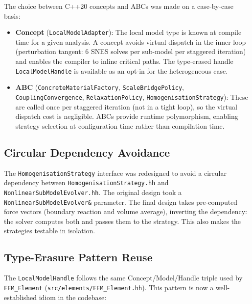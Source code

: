 The choice between C++20 concepts and ABCs was made on a
case-by-case basis:

\begin{itemize}
  \item \textbf{Concept} (\texttt{LocalModelAdapter}): The local
    model type is known at compile time for a given analysis.  A
    concept avoids virtual dispatch in the inner loop (perturbation
    tangent: 6 SNES solves per sub-model per staggered iteration)
    and enables the compiler to inline critical paths.  The
    type-erased handle \texttt{LocalModelHandle} is available as an
    opt-in for the heterogeneous case.

  \item \textbf{ABC} (\texttt{ConcreteMaterialFactory},
    \texttt{ScaleBridgePolicy}, \texttt{CouplingConvergence},
    \texttt{RelaxationPolicy}, \texttt{HomogenisationStrategy}):
    These are called once per staggered iteration (not in a tight
    loop), so the virtual dispatch cost is negligible.  ABCs provide
    runtime polymorphism, enabling strategy selection at
    configuration time rather than compilation time.
\end{itemize}

\subsection{Circular Dependency Avoidance}
\label{sec:refactor-circular-deps}

The \texttt{HomogenisationStrategy} interface was redesigned to
avoid a circular dependency between
\texttt{HomogenisationStrategy.hh} and
\texttt{NonlinearSubModelEvolver.hh}.  The original design took a
\texttt{NonlinearSubModelEvolver\&} parameter.  The final design
takes pre-computed force vectors (boundary reaction and volume
average), inverting the dependency: the solver computes both and
passes them to the strategy.  This also makes the strategies
testable in isolation.

\subsection{Type-Erasure Pattern Reuse}
\label{sec:refactor-type-erasure-pattern}

The \texttt{LocalModelHandle} follows the same Concept/Model/Handle
triple used by \texttt{FEM\_Element}
(\texttt{src/elements/FEM\_Element.hh}).  This pattern is now a
well-established idiom in the codebase:

